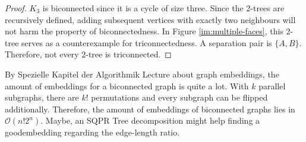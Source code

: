 \begin{proof}
	$K_3$ is biconnected since it is a cycle of size three. Since the 2-trees are recursively defined, adding subsequent vertices with exactly two neighbours will not harm the property of biconnectedness. In Figure \ref{im:multiple-faces}, this 2-tree serves as a counterexample for triconnectedness. A separation pair is $\{A,B\}$. Therefore, not every 2-tree is triconnected.
\end{proof}
By Spezielle Kapitel der Algorithmik Lecture about graph embeddings, the amount of embeddings for a biconnected graph is quite a lot. With $k$ parallel subgraphs, there are $k!$ permutations and every subgraph can be flipped additionally. Therefore, the amount of embeddings of biconnected graphs lies in $\mathcal{O}(n!2^n)$. Maybe, an SQPR Tree decomposition might help finding a \grqq good\grqq embedding regarding the edge-length ratio.\\
